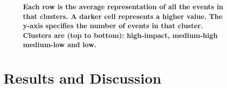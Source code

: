 \documentclass[10pt,letterpaper]{article}
\begin{document}
\begin{figure}
  \caption{\textbf{Each row is the average representation of all the
      events in that clusters.  A darker cell represents a higher
      value.  The y-axis specifies the number of events in that
      cluster.  Clusters are (top to bottom): high-impact, medium-high
      medium-low and low.}
  }
  \label{fig:low_buzz_high_buzz}
\end{figure}

\section*{Results and Discussion}
\end{document}

